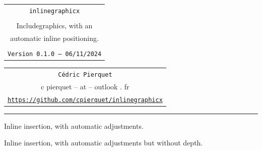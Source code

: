\documentclass[11pt,a4paper]{ltxdoc}
\def\TPversion{0.1.0}
\def\TPdate{06/11/2024}
\begin{document}
\thispagestyle{empty}

\begin{center}
	\begin{minipage}{0.88\linewidth}
		\begin{tcolorbox}[colframe=yellow,colback=yellow!15]
			\begin{center}
				\renewcommand{\arraystretch}{1.25}%
				\begin{tabular}{c}
					{\Huge \texttt{inlinegraphicx}}\\
					\\
					{\LARGE Includegraphics, with an} \\
					{\LARGE automatic inline positioning.} \\
					\\
					{\small \texttt{Version \TPversion{} -- \TPdate}}
				\end{tabular}
			\end{center}
		\end{tcolorbox}
	\end{minipage}
\end{center}

\begin{center}
	\begin{tabular}{c}
		\texttt{Cédric Pierquet}\\
		{\ttfamily c pierquet -- at -- outlook . fr}\\
		\texttt{\url{https://github.com/cpierquet/inlinegraphicx}} \\
	\end{tabular}
\end{center}

\hrule

\vfill

\begin{tcolorbox}[colframe=lightgray,colback=lightgray!5]
{Inline insertion,  with automatic adjustments.}
\end{tcolorbox}

\begin{tcolorbox}[colframe=lightgray,colback=lightgray!5]
\end{tcolorbox}

\begin{tcolorbox}[colframe=lightgray,colback=lightgray!5]
{Inline insertion,  with automatic adjustments but without depth.}
\end{tcolorbox}
\end{document}
